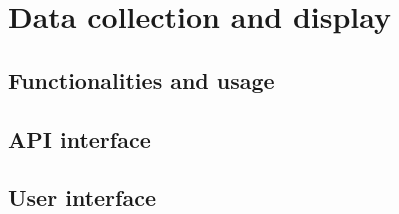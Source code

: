 \chapter{Data collection and display}

\section{Functionalities and usage}
\section{API interface}
\section{User interface}